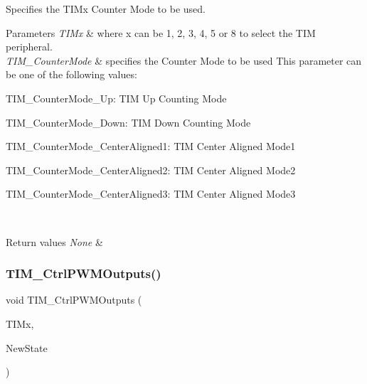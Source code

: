 Specifies the T\+I\+Mx Counter Mode to be used. 


\begin{DoxyParams}{Parameters}
{\em T\+I\+Mx} & where x can be 1, 2, 3, 4, 5 or 8 to select the T\+IM peripheral. \\
\hline
{\em T\+I\+M\+\_\+\+Counter\+Mode} & specifies the Counter Mode to be used This parameter can be one of the following values\+: \begin{DoxyItemize}
\item T\+I\+M\+\_\+\+Counter\+Mode\+\_\+\+Up\+: T\+IM Up Counting Mode \item T\+I\+M\+\_\+\+Counter\+Mode\+\_\+\+Down\+: T\+IM Down Counting Mode \item T\+I\+M\+\_\+\+Counter\+Mode\+\_\+\+Center\+Aligned1\+: T\+IM Center Aligned Mode1 \item T\+I\+M\+\_\+\+Counter\+Mode\+\_\+\+Center\+Aligned2\+: T\+IM Center Aligned Mode2 \item T\+I\+M\+\_\+\+Counter\+Mode\+\_\+\+Center\+Aligned3\+: T\+IM Center Aligned Mode3 \end{DoxyItemize}
\\
\hline
\end{DoxyParams}

\begin{DoxyRetVals}{Return values}
{\em None} & \\
\hline
\end{DoxyRetVals}
\mbox{\label{group___t_i_m___exported___functions_ga3e59ebced2ab8e0b817c460f1670e97d}} 
\subsubsection{\texorpdfstring{TIM\_CtrlPWMOutputs()}{TIM\_CtrlPWMOutputs()}}
{\footnotesize\ttfamily void T\+I\+M\+\_\+\+Ctrl\+P\+W\+M\+Outputs (\begin{DoxyParamCaption}\item[{\mbox{\hyperlink{struct_t_i_m___type_def}{T\+I\+M\+\_\+\+Type\+Def}} $\ast$}]{T\+I\+Mx,  }\item[{\mbox{\hyperlink{group___exported__types_gac9a7e9a35d2513ec15c3b537aaa4fba1}{Functional\+State}}}]{New\+State }\end{DoxyParamCaption})}



